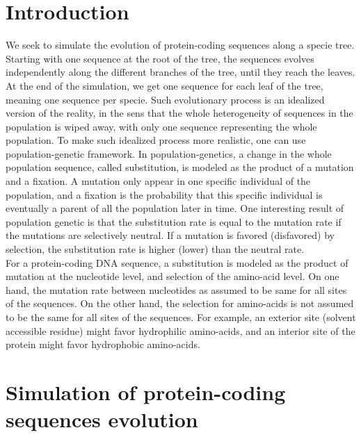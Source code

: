 \section{Introduction}

We seek to simulate the evolution of protein-coding sequences along a specie tree.
Starting with one sequence at the root of the tree, the sequences evolves independently along the different branches of the tree, until they reach the leaves. At the end of the simulation, we get one sequence for each leaf of the tree, meaning one sequence per specie.
Such evolutionary process is an idealized version of the reality, in the sens that the whole heterogeneity of sequences in the population is wiped away, with only one sequence representing the whole population. To make such idealized process more realistic, one can use population-genetic framework. In population-genetics, a change in the whole population sequence, called \gls{substitution}, is modeled as the product of a mutation and a fixation. A mutation only appear in one specific individual of the population, and a fixation is the probability that this specific individual is eventually a parent of all the population later in time. One interesting result of population genetic is that the \gls{substitution} rate is equal to the mutation rate if the mutations are selectively \gls{neutral}. If a mutation is favored (disfavored) by selection, the \gls{substitution} rate is higher (lower) than the \gls{neutral} rate.\\

For a protein-coding \acrshort{DNA} sequence, a \gls{substitution} is modeled as the product of mutation at the nucleotide level, and selection of the amino-acid level. On one hand, the mutation rate between nucleotides as assumed to be same for all sites of the sequences. On the other hand, the selection for amino-acids is not assumed to be the same for all sites of the sequences. For example, an exterior site (solvent accessible residue) might favor hydrophilic amino-acids, and an interior site of the protein might favor hydrophobic amino-acids.

\section{Simulation of protein-coding sequences evolution}

